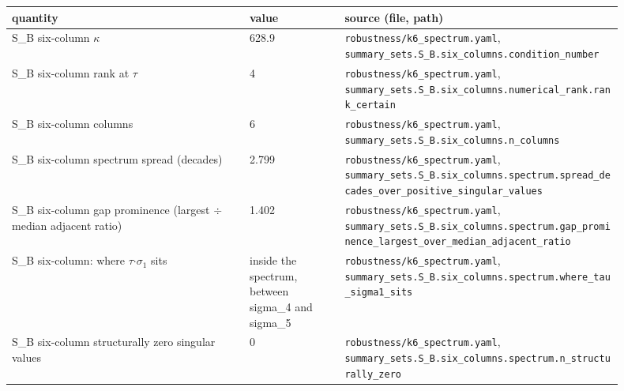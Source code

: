 \begin{longtable}{p{0.35\linewidth} p{0.14\linewidth} p{0.41\linewidth}}
\toprule
quantity & value & source (file, path) \\
\midrule
\endhead
S\_B six-column $\kappa$ & 628.9 & \texttt{\footnotesize robustness/k6\_\allowbreak{}spectrum.\allowbreak{}yaml}, \texttt{\footnotesize summary\_\allowbreak{}sets.\allowbreak{}S\_\allowbreak{}B.\allowbreak{}six\_\allowbreak{}columns.\allowbreak{}condition\_\allowbreak{}number} \\
S\_B six-column rank at $\tau$ & 4 & \texttt{\footnotesize robustness/k6\_\allowbreak{}spectrum.\allowbreak{}yaml}, \texttt{\footnotesize summary\_\allowbreak{}sets.\allowbreak{}S\_\allowbreak{}B.\allowbreak{}six\_\allowbreak{}columns.\allowbreak{}numerical\_\allowbreak{}rank.\allowbreak{}rank\_\allowbreak{}certain} \\
S\_B six-column columns & 6 & \texttt{\footnotesize robustness/k6\_\allowbreak{}spectrum.\allowbreak{}yaml}, \texttt{\footnotesize summary\_\allowbreak{}sets.\allowbreak{}S\_\allowbreak{}B.\allowbreak{}six\_\allowbreak{}columns.\allowbreak{}n\_\allowbreak{}columns} \\
S\_B six-column spectrum spread (decades) & 2.799 & \texttt{\footnotesize robustness/k6\_\allowbreak{}spectrum.\allowbreak{}yaml}, \texttt{\footnotesize summary\_\allowbreak{}sets.\allowbreak{}S\_\allowbreak{}B.\allowbreak{}six\_\allowbreak{}columns.\allowbreak{}spectrum.\allowbreak{}spread\_\allowbreak{}decades\_\allowbreak{}over\_\allowbreak{}positive\_\allowbreak{}singular\_\allowbreak{}values} \\
S\_B six-column gap prominence (largest $\div$ median adjacent ratio) & 1.402 & \texttt{\footnotesize robustness/k6\_\allowbreak{}spectrum.\allowbreak{}yaml}, \texttt{\footnotesize summary\_\allowbreak{}sets.\allowbreak{}S\_\allowbreak{}B.\allowbreak{}six\_\allowbreak{}columns.\allowbreak{}spectrum.\allowbreak{}gap\_\allowbreak{}prominence\_\allowbreak{}largest\_\allowbreak{}over\_\allowbreak{}median\_\allowbreak{}adjacent\_\allowbreak{}ratio} \\
S\_B six-column: where $\tau$$\cdot$$\sigma_1$ sits & inside the spectrum, between sigma\_4 and sigma\_5 & \texttt{\footnotesize robustness/k6\_\allowbreak{}spectrum.\allowbreak{}yaml}, \texttt{\footnotesize summary\_\allowbreak{}sets.\allowbreak{}S\_\allowbreak{}B.\allowbreak{}six\_\allowbreak{}columns.\allowbreak{}spectrum.\allowbreak{}where\_\allowbreak{}tau\_\allowbreak{}sigma1\_\allowbreak{}sits} \\
S\_B six-column structurally zero singular values & 0 & \texttt{\footnotesize robustness/k6\_\allowbreak{}spectrum.\allowbreak{}yaml}, \texttt{\footnotesize summary\_\allowbreak{}sets.\allowbreak{}S\_\allowbreak{}B.\allowbreak{}six\_\allowbreak{}columns.\allowbreak{}spectrum.\allowbreak{}n\_\allowbreak{}structurally\_\allowbreak{}zero} \\

\end{longtable}
